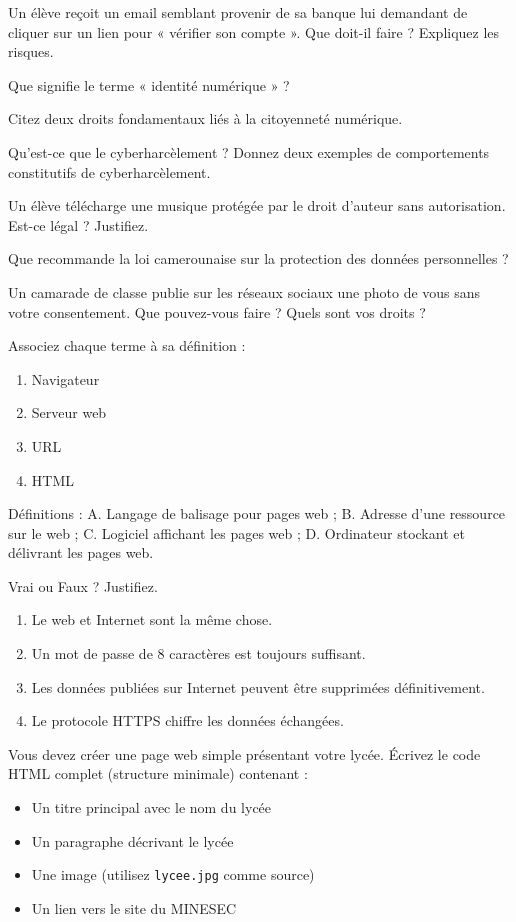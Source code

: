 \exo{}
Un élève reçoit un email semblant provenir de sa banque lui demandant de cliquer sur un lien pour « vérifier son compte ». Que doit-il faire ? Expliquez les risques.


\exo{}
Que signifie le terme « identité numérique » ?

\exo{}
Citez deux droits fondamentaux liés à la citoyenneté numérique.

\exo{}
Qu'est-ce que le cyberharcèlement ? Donnez deux exemples de comportements constitutifs de cyberharcèlement.

\exo{}
Un élève télécharge une musique protégée par le droit d'auteur sans autorisation. Est-ce légal ? Justifiez.

\exo{}
Que recommande la loi camerounaise sur la protection des données personnelles ?

\exo{}
Un camarade de classe publie sur les réseaux sociaux une photo de vous sans votre consentement. Que pouvez-vous faire ? Quels sont vos droits ?


\exo{}
Associez chaque terme à sa définition :
\begin{enumerate}
    \item Navigateur
    \item Serveur web
    \item URL
    \item HTML
\end{enumerate}
Définitions : A. Langage de balisage pour pages web ; B. Adresse d'une ressource sur le web ; C. Logiciel affichant les pages web ; D. Ordinateur stockant et délivrant les pages web.

\exo{}
Vrai ou Faux ? Justifiez.
\begin{enumerate}
    \item Le web et Internet sont la même chose.
    \item Un mot de passe de 8 caractères est toujours suffisant.
    \item Les données publiées sur Internet peuvent être supprimées définitivement.
    \item Le protocole HTTPS chiffre les données échangées.
\end{enumerate}

\exo{}
Vous devez créer une page web simple présentant votre lycée. Écrivez le code HTML complet (structure minimale) contenant :
\begin{itemize}
    \item Un titre principal avec le nom du lycée
    \item Un paragraphe décrivant le lycée
    \item Une image (utilisez \texttt{lycee.jpg} comme source)
    \item Un lien vers le site du MINESEC
\end{itemize}

